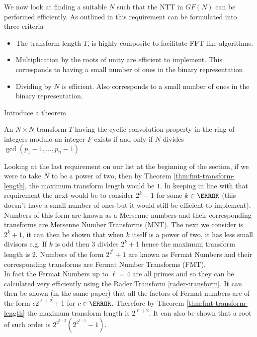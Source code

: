 We now look at finding a suitable $N$ such that the NTT in $GF(N)$ can be performed efficiently. As outlined in \cite{intro-to-fmt} this requirement can be formulated into three criteria
\begin{itemize}
\item The transform length $T$, is highly composite to facilitate FFT-like algorithms.
\item Multiplication by the roots of unity are efficient to implement. This corresponds to having a small number of ones in the binary representation
\item Dividing by $N$ is efficient. Also corresponds to a small number of ones in the binary representation.
\end{itemize}

Introduce a theorem
\begin{theorem}\label{thm:fmt-transform-length}
    An $N \times N$ transform $T$ having the cyclic convolution property in the ring of integers modulo an integer $F$ exists if and only if $N$ divides $\gcd(p_1 - 1, \ldots, p_n - 1)$
\end{theorem}

Looking at the last requirement on our list at the beginning of the section, if we were to take $N$ to be a power of two, then by Theorem \ref{thm:fmt-transform-length}, the maximum transform length would be $1$. In keeping in line with that requirement the next would be to consider $2^k - 1$  for some $k \in \N$ (this doesn't have a small number of ones but it would still be efficient to implement). Numbers of this form are known as a Mersenne numbers and their corresponding transforms are Mersenne Number Transforms (MNT). The next we consider is $2^k + 1$, it can then be shown that when $k$ itself is a power of two, it has less small divisors e.g. If $k$ is odd then $3$ divides $2^k + 1$ hence the maximum transform length is $2$. Numbers of the form $2^{2^\ell} + 1$ are known as Fermat Numbers and their corresponding transforms are Fermat Number Transforms (FMT).\\

In fact the Fermat Numbers up to $\ell = 4$ are all primes and so they can be calculated very efficiently using the Rader Transform \ref{rader-transform}. It can then be shown (in the same paper) that all the factors of Fermat numbers are of the form $c2^{\ell + 2} + 1$ for $c \in \N$. Therefore by Theorem \ref{thm:fmt-transform-length} the maximum transform length is $2^{\ell + 2}$. It can also be shown that a root of such order is $2^{2^{t-2}}(2^{2^{t-1}} - 1)$.\\

